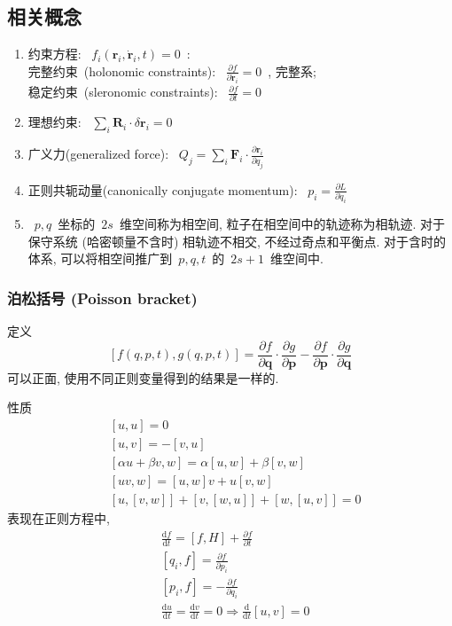 \documentclass[11pt,a4paper]{article}%
\renewcommand*{\vec}[1]{\bm{#1}}%
\newcommand{\dif}{\mathrm{d}}
\renewcommand{\[}{~$\displaystyle}
\renewcommand{\]}{$~}%
\newcommand{\pard}[2]{\ensuremath{\frac{\partial #1}{\partial #2}}}
\begin{document}
   
\subsection{相关概念}
  \begin{enumerate}
	  \item 约束方程: \[f_i(\vec{r}_i,\dot{\vec r}_i,t) = 0\]: \\
	  	完整约束~(holonomic constraints): \[\pard{f}{\dot{\vec r}_i} = 0\], 完整系; \\
	  	稳定约束~(sleronomic constraints): \[\pard{f}{t} = 0\]
	  \item 理想约束: \[\sum_i \vec{R}_i\cdot \delta\vec{r}_i = 0\]
	  \item 广义力(generalized force): \[Q_j = \sum_i \vec{F}_i\cdot\pard{\vec{r}_i}{q_j}\]
	  \item 正则共轭动量(canonically conjugate momentum): \[p_i = \pard{L}{\dot{q}_i}\]
	  \item \[p,q\]坐标的\[2s\]维空间称为相空间, 粒子在相空间中的轨迹称为相轨迹. 对于保守系统 (哈密顿量不含时) 相轨迹不相交, 不经过奇点和平衡点. 对于含时的体系, 可以将相空间推广到\[p,q,t\]的\[2s+1\]维空间中. 
  \end{enumerate}
  \subsubsection{泊松括号 (Poisson bracket)}
  定义
  $$[f(q,p,t),g(q,p,t)] = \frac{\partial f}{\partial \bm q}\cdot\frac{\partial g}{\partial \bm p} - \frac{\partial f}{\partial \bm p}\cdot\frac{\partial g}{\partial \bm q}$$
  可以正面, 使用不同正则变量得到的结果是一样的. 
  
  性质
  \begin{align*}
   &[u,u] = 0\\
   &[u,v] = -[v,u] \\
   &[\alpha u+\beta v,w] = \alpha[u,w] + \beta[v,w]\\
   &[uv,w] =[u,w]v + u[v,w] \\
   &[u,[v,w]] + [v,[w,u]] + [w,[u,v]] = 0
  \end{align*}
  表现在正则方程中, 
  \begin{align*}
   &\frac{\dif f}{\dif t} = [f,H] + \frac{\partial f}{\partial t} \\
   &[q_i,f] = \frac{\partial f}{\partial p_i}\\
   &[p_i,f] = -\frac{\partial f}{\partial q_i} \\
   &\frac{\dif u}{\dif t} = \frac{\dif v}{\dif t} = 0 \Rightarrow \frac{\dif}{\dif t}[u,v] = 0
  \end{align*}
\end{document}
